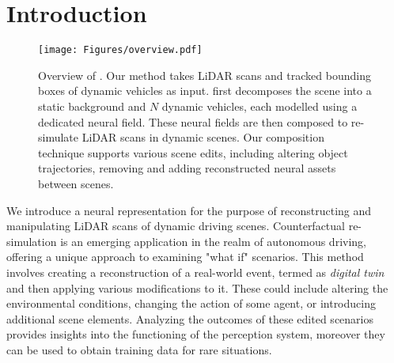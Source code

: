 \section{Introduction}
\begin{figure*}[t]
    \centering
        \texttt{[image: Figures/overview.pdf]}
        \caption{
        Overview of \dynfl. Our method takes LiDAR scans and tracked bounding boxes of dynamic vehicles as input. \dynfl first decomposes the scene into a static background and $N$ dynamic vehicles, each modelled using a dedicated neural field. These neural fields are then composed to re-simulate LiDAR scans in dynamic scenes. Our composition technique supports various scene edits, including altering object trajectories, removing and adding reconstructed neural assets between scenes.
    }
    \label{fig:main}
\end{figure*}

We introduce a neural representation for the purpose of reconstructing and manipulating LiDAR scans of dynamic driving scenes. 
Counterfactual re-simulation is an emerging application in the realm of autonomous driving, offering a unique approach to examining "what if" scenarios. This method involves creating a reconstruction of a real-world event, termed as \textit{digital twin} and then applying various modifications to it. These could include altering the environmental conditions, changing the action of some agent, or introducing additional scene elements. Analyzing the outcomes of these edited scenarios provides insights into the functioning of the perception system, moreover they can be used to obtain training data for rare situations.

